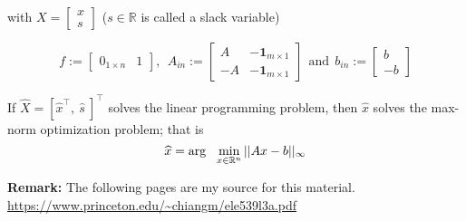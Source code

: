 \documentclass[letterpaper]{article}
\newcommand{\real}{\mathbb R}  %
\begin{document}
with $X = \left[\begin{array}{c}  x\\ s \end{array} \right]$ ($s\in \real$ is called a slack variable)

$$f:=\left[ \begin{array}{cc}0_{1 \times n} & 1 \end{array} \right], ~~A_{in}:= \left[ \begin{array}{rr}  A  & -\textbf{1}_{m \times 1}  \\
 -A  & -\textbf{1}_{m \times 1}\end{array} \right] ~~\text{and}~~ b_{in}:=\left[\begin{array}{r}  b\\ -b \end{array} \right]$$

If $\widehat{X}=[\widehat{x}^\top, ~ \widehat{s} \ ]^\top $  solves the linear programming problem, then  $\widehat{x}$ solves the max-norm optimization problem; that is
$$ \widehat{x} = {\rm arg}~~\min_{x \in \real^n} ||Ax - b||_\infty$$

\vspace*{2cm} 
\textbf{Remark:} The following pages are my source for this material. \\
\url{https://www.princeton.edu/~chiangm/ele539l3a.pdf}


\end{document}
